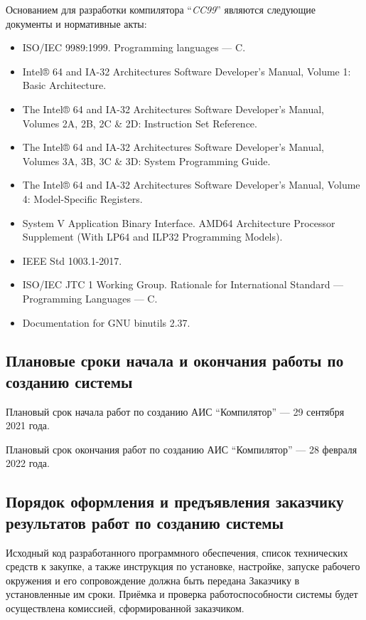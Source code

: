 \documentclass[14pt,russian]{extarticle}
\begin{document}
Основанием для разработки компилятора \enquote{\textit{CC99}} являются следующие
документы и нормативные акты:

\begin{itemize}
	\item ISO/IEC 9989:1999. Programming languages --- C.
	\item Intel® 64 and IA-32 Architectures Software Developer’s Manual, Volume 1:
		Basic Architecture.
	\item The Intel® 64 and IA-32 Architectures Software Developer’s Manual,
		Volumes 2A, 2B, 2C \& 2D: Instruction Set Reference.
	\item The Intel® 64 and IA-32 Architectures Software Developer’s Manual,
		Volumes 3A, 3B, 3C \& 3D: System Programming Guide.
	\item The Intel® 64 and IA-32 Architectures Software Developer’s Manual,
		Volume 4: Model-Specific Registers.
	\item System V Application Binary Interface. AMD64 Architecture Processor
		Supplement (With LP64 and ILP32 Programming Models).
	\item IEEE Std 1003.1-2017.
	\item ISO/IEC JTC 1 Working Group. Rationale for International Standard ---
		Programming Languages --- C.
	\item Documentation for GNU binutils 2.37.
\end{itemize}

\subsection{Плановые сроки начала и окончания работы по созданию системы}

Плановый срок начала работ по созданию АИС \enquote{Компилятор} --- 29 сентября 2021 года.

Плановый срок окончания работ по созданию АИС \enquote{Компилятор} --- 28 февраля 2022 года.

\subsection{Порядок оформления и предъявления заказчику результатов работ по
созданию системы}

Исходный код разработанного программного обеспечения, список технических средств
к закупке, а также инструкция по установке, настройке, запуске рабочего
окружения и его сопровождение должна быть передана Заказчику в установленные им
сроки. Приёмка и проверка работоспособности системы будет осуществлена
комиссией, сформированной заказчиком.
\end{document}

